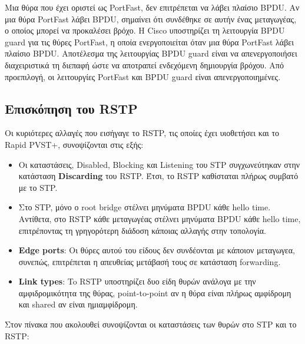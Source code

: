 \documentclass[eforms]{EdipyLabs} %
\begin{document}
Μια θύρα που έχει οριστεί ως PortFast, δεν επιτρέπεται να λάβει πλαίσιο BPDU. Αν μια θύρα PortFast λάβει BPDU, σημαίνει ότι συνδέθηκε σε αυτήν ένας μεταγωγέας, ο οποίος μπορεί να προκαλέσει βρόχο. Η Cisco υποστηρίζει τη λειτουργία BPDU guard για τις θύρες PortFast, η οποία ενεργοποιείται όταν μια θύρα PortFast λάβει πλαίσιο BPDU. Αποτέλεσμα της λειτουργίας BPDU guard είναι να απενεργοποιήσει διαχειριστικά τη διεπαφή ώστε να αποτραπεί ενδεχόμενη δημιουργία βρόχου. Από προεπιλογή, οι λειτουργίες PortFast και BPDU guard είναι απενεργοποιημένες.

\newpage

\subsection{Επισκόπηση του RSTP} 

Οι κυριότερες αλλαγές που εισήγαγε το RSTP, τις οποίες έχει υιοθετήσει και το Rapid PVST+, συνοψίζονται στις εξής:
\begin{itemize}
	\item Οι καταστάσεις, Disabled, Blocking και Listening του STP συγχωνεύτηκαν στην κατάσταση \textbf{Discarding} του RSTP. Έτσι, το RSTP καθίσταται πλήρως συμβατό με το STP.
	\item Στο STP, μόνο ο root bridge στέλνει μηνύματα BPDU κάθε hello time. Αντίθετα, στο RSTP κάθε μεταγωγέας στέλνει μηνύματα BPDU κάθε hello time, επιτρέποντας τη γρηγορότερη διάδοση κάποιας αλλαγής στην τοπολογία.
	\item \textbf{Edge ports}: Οι θύρες αυτού του είδους δεν συνδέονται με κάποιον μεταγωγεα, συνεπώς, επιτρέπεται η απευθείας μετάβασή τους σε κατάσταση forwarding.
	\item \textbf{Link types}: To RSTP υποστηρίζει δυο είδη θυρών ανάλογα με την αμφιδρομικότητα της θύρας, point-to-point αν η θύρα είναι πλήρως αμφίδρομη και shared αν είναι ημιαμφίδρομη.
\end{itemize}
Στον πίνακα που ακολουθεί συνοψίζονται οι καταστάσεις των θυρών στο STP και το RSTP:
\end{document}
